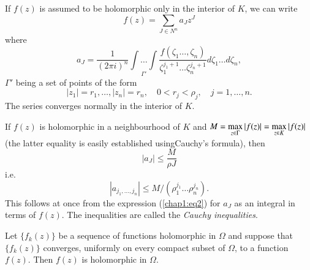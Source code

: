 If $f(z)$ is assumed to be holomorphic only in the interior of $K$, we
can write
$$
f(z) = \sum\limits_{J\in N^n} a_J z^J
$$
where 
$$
a_J = \frac{1}{(2\pi i)^n} \underset{\Gamma'}{\int\ldots\int} 
\frac{f(\zeta_1 \ldots, \zeta_n)}{\zeta_1^{j_1+1} \ldots
  \zeta_n^{j_n+1}}   d\zeta_1\ldots d\zeta_n, 
$$
$\Gamma'$ being a set of points of the form 
$$
|z_1| = r_1, \ldots , |z_n| = r_n, \quad 0 < r_j < \rho_j, \quad j =
1, \ldots, n.
$$
The series converges normally in the interior of $K$.

If $f(z)$ is holomorphic in a neighbourhood of $K$ and $M =
\max\limits_{z\in\Gamma}\break |f(z)| = \max\limits_{z\in K}|f(z)|$  (the
latter equality is easily established using\break Cauchy's formula), then 
$$
|a_J| \leq \frac{M}{\rho J}
$$
i.e.
$$
|a_{j_1, \ldots, j_n}| \leq M/ (\rho^{j_1}_1 \ldots \rho^{j_n}_n). 
$$
This follows at once from the expression (\ref{chap1:eq2}) for $a_J$ as an integral
in terms of $f(z)$. The inequalities are called the \textit{Cauchy
  inequalities}. 

\begin{proposition}\label{chap1:prop2}
Let $\{f_k(z)\}$ be a sequence of functions holomorphic in $\Omega$
and suppose that $\{f_k(z)\}$ converges, uniformly on every compact
subset of $\Omega$, to a function $f(z)$. Then $f(z)$ is holomorphic
in $\Omega$. 
\end{proposition}

